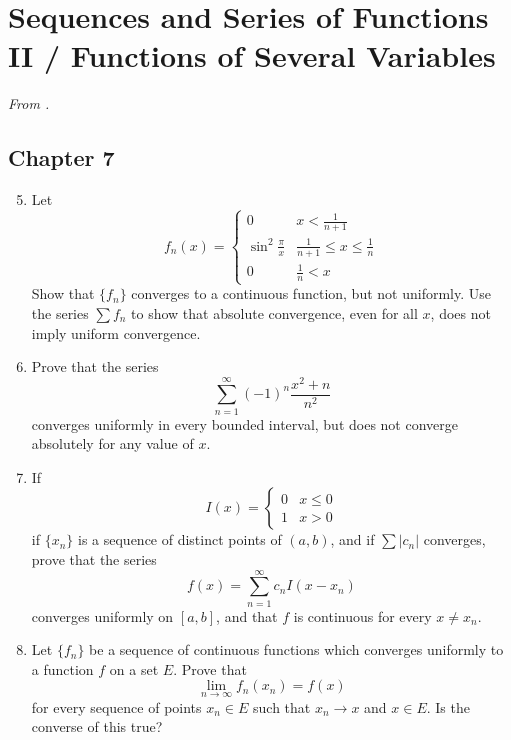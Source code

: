 \documentclass[../psets.tex]{subfiles}
\begin{document}
\section{Sequences and Series of Functions II / Functions of Several Variables}
\emph{From \textcite{bib:Rudin}.}
\subsection*{Chapter 7}
\begin{enumerate}[label={\textbf{\arabic*.}}]
    \setcounter{enumi}{4}
    \item {}Let
    \begin{equation*}
        f_n(x) =
        \begin{cases}
            0 & x<\frac{1}{n+1}\\
            \sin^2\frac{\pi}{x} & \frac{1}{n+1}\leq x\leq\frac{1}{n}\\
            0 & \frac{1}{n}<x
        \end{cases}
    \end{equation*}
    Show that $\{f_n\}$ converges to a continuous function, but not uniformly. Use the series $\sum f_n$ to show that absolute convergence, even for all $x$, does not imply uniform convergence.
    \item Prove that the series
    \begin{equation*}
        \sum_{n=1}^\infty(-1)^n\frac{x^2+n}{n^2}
    \end{equation*}
    converges uniformly in every bounded interval, but does not converge absolutely for any value of $x$.
    \item If
    \begin{equation*}
        I(x) =
        \begin{cases}
            0 & x\leq 0\\
            1 & x>0
        \end{cases}
    \end{equation*}
    if $\{x_n\}$ is a sequence of distinct points of $(a,b)$, and if $\sum|c_n|$ converges, prove that the series
    \begin{equation*}
        f(x) = \sum_{n=1}^\infty c_nI(x-x_n)
    \end{equation*}
    converges uniformly on $[a,b]$, and that $f$ is continuous for every $x\neq x_n$.
    \item Let $\{f_n\}$ be a sequence of continuous functions which converges uniformly to a function $f$ on a set $E$. Prove that
    \begin{equation*}
        \lim_{n\to\infty}f_n(x_n) = f(x)
    \end{equation*}
    for every sequence of points $x_n\in E$ such that $x_n\to x$ and $x\in E$. Is the converse of this true?
\end{enumerate}
\end{document}

